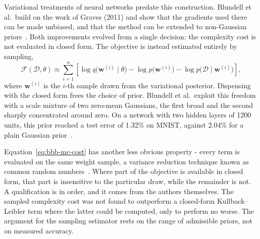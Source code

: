 Variational treatments of neural networks predate this construction. Blundell et
al.\ build on the work of Graves (2011) and show that the gradients used there can
be made unbiased, and that the method can be extended to non-Gaussian priors~\cite{blundell2015}. Both improvements evolved from a single decision: the complexity cost is not evaluated in closed form. The objective is instead estimated entirely by sampling,
%
\begin{equation}
    \mathcal{F}(\mathcal{D}, \theta)
    \approx \sum_{i=1}^{n}
      \left[
        \log q\bigl(\mathbf{w}^{(i)} \mid \theta\bigr)
        - \log p\bigl(\mathbf{w}^{(i)}\bigr)
        - \log p\bigl(\mathcal{D} \mid \mathbf{w}^{(i)}\bigr)
      \right] ,
    \label{eq:bbb-mc-cost}
\end{equation}
%
where $\mathbf{w}^{(i)}$ is the $i$-th sample drawn from the variational posterior.
Dispensing with the closed form frees the choice of prior. Blundell et al.\ exploit
this freedom with a scale mixture of two zero-mean Gaussians, the first broad and
the second sharply concentrated around zero. On a network with two hidden layers of
1200 units, this prior reached a test error of 1.32\% on MNIST, against 2.04\% for a
plain Gaussian prior~\cite{blundell2015}.

Equation~\eqref{eq:bbb-mc-cost} has another less obvious property - every term is
evaluated on the same weight sample, a variance reduction technique known as common
random numbers~\cite{blundell2015}. Where part of the objective is available in
closed form, that part is insensitive to the particular draw, while the remainder is
not. A qualification is in order, and it comes from the authors themselves. The
sampled complexity cost was not found to outperform a closed-form Kullback--Leibler
term where the latter could be computed, only to perform no worse. The argument for
the sampling estimator rests on the range of admissible priors, not on measured
accuracy.

